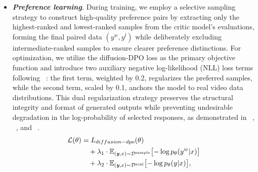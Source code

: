 \begin{itemize}
\item  \textit{\textbf{Preference learning}.} 
During training, we employ a selective sampling strategy to construct high-quality preference pairs by extracting only the highest-ranked and lowest-ranked samples from the critic model's evaluations, forming the final paired data $(y^{w}, y^{l})$ while deliberately excluding intermediate-ranked samples to ensure clearer preference distinctions. For optimization, we utilize the diffusion-DPO loss as the primary objective function and introduce two auxiliary negative log-likelihood (NLL) loss terms following ~\cite{pang2024iterativereasoningpreferenceoptimization}: the first term, weighted by 0.2, regularizes the preferred samples, while the second term, scaled by 0.1, anchors the model to real video data distributions. This dual regularization strategy preserves the structural integrity and format of generated outputs while preventing undesirable degradation in the log-probability of selected responses, as demonstrated in ~\cite{pal2024smaugfixingfailuremodes}, ~\cite{grattafiori2024llama3herdmodels}, and ~\cite{pang2024iterativereasoningpreferenceoptimization}.
\begin{equation}
\begin{aligned}
\mathcal{L}(\theta) &= L_{diffusion-dpo}(\theta) \\
&\quad + \lambda_1 \cdot \mathbb{E}_{(\textbf{\textit{y}}, x) \sim \mathcal{D}^{\mathrm{sample}}} \bigl[-\log p_{\theta}(y^w|x)\bigr] \\
&\quad + \lambda_2 \cdot \mathbb{E}_{(\textbf{\textit{y}}, x) \sim \mathcal{D}^{\mathrm{real}}} \bigl[-\log p_{\theta}(y|x)\bigr],
\end{aligned}
\end{equation}
\end{itemize}

